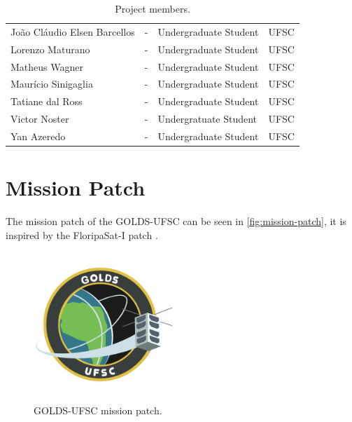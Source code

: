 \begin{table}[ht]
\begin{tabular}{lllc}
        João Cláudio Elsen Barcellos        & -         & Undergraduate Student & UFSC \\
        Lorenzo Maturano                    & -         & Undergraduate Student & UFSC \\
        Matheus Wagner                      & -         & Undergraduate Student & UFSC \\
        Maurício Sinigaglia                 & -         & Undergraduate Student & UFSC \\
        Tatiane dal Ross                    & -         & Undergraduate Student & UFSC \\
        Victor Noster                       & -         & Undergratuate Student & UFSC \\
        Yan Azeredo                         & -         & Undergraduate Student & UFSC \\
        \bottomrule[1.5pt]
    \end{tabular}
    \caption{Project members.}
    \label{tab:team-members}
\end{table}

\section{Mission Patch}

The mission patch of the GOLDS-UFSC can be seen in \autoref{fig:mission-patch}, it is inspired by the FloripaSat-I patch \cite{floripasat}.

\begin{figure}[!ht]
    \begin{center}
        \includegraphics[width=0.5\textwidth]{figures/golds-ufsc-patch.png}
        \caption{GOLDS-UFSC mission patch.}
        \label{fig:mission-patch}
    \end{center}
\end{figure}
